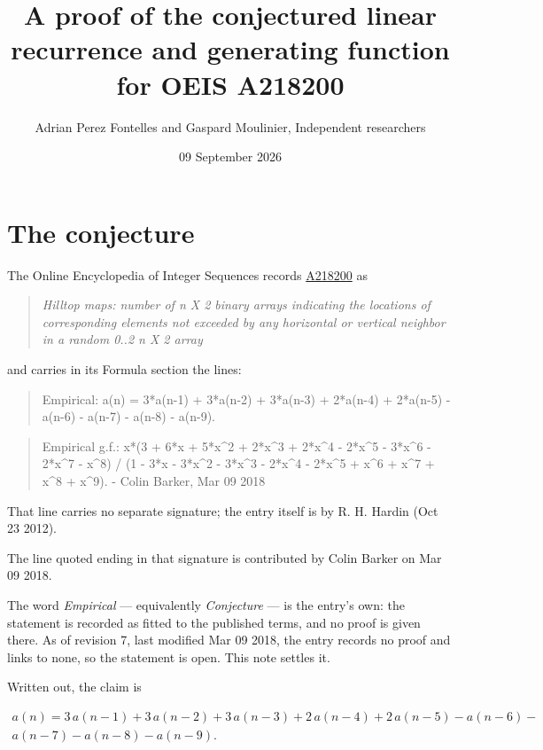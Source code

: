 \documentclass[11pt]{article}
\title{A proof of the conjectured linear recurrence and generating function for OEIS A218200}
\author{Adrian Perez Fontelles and Gaspard Moulinier, Independent researchers}
\date{09 September 2026}
\theoremstyle{definition}
\begin{document}
\maketitle
\section{The conjecture}

The Online Encyclopedia of Integer Sequences records \href{https://oeis.org/A218200}{A218200} as

\begin{quote}\itshape Hilltop maps: number of n X 2 binary arrays indicating the locations of corresponding elements not exceeded by any horizontal or vertical neighbor in a random 0..2 n X 2 array\end{quote}

and carries in its Formula section the lines:

\begin{quote}\ttfamily Empirical: a(n) = 3*a(n-1) + 3*a(n-2) + 3*a(n-3) + 2*a(n-4) + 2*a(n-5) - a(n-6) - a(n-7) - a(n-8) - a(n-9).\end{quote}

\begin{quote}\ttfamily Empirical g.f.: x*(3 + 6*x + 5*x\textasciicircum{}2 + 2*x\textasciicircum{}3 + 2*x\textasciicircum{}4 - 2*x\textasciicircum{}5 - 3*x\textasciicircum{}6 - 2*x\textasciicircum{}7 - x\textasciicircum{}8) / (1 - 3*x - 3*x\textasciicircum{}2 - 3*x\textasciicircum{}3 - 2*x\textasciicircum{}4 - 2*x\textasciicircum{}5 + x\textasciicircum{}6 + x\textasciicircum{}7 + x\textasciicircum{}8 + x\textasciicircum{}9). - Colin Barker, Mar 09 2018\end{quote}

That line carries no separate signature; the entry itself is by R. H. Hardin (Oct 23 2012).

The line quoted ending in that signature is contributed by Colin Barker on Mar 09 2018.

The word {\itshape Empirical} --- equivalently {\itshape Conjecture} --- is the entry's own: the statement is recorded as fitted to the published terms, and no proof is given there. As of revision 7, last modified Mar 09 2018, the entry records no proof and links to none, so the statement is open. This note settles it.

Written out, the claim is

\begin{multline*} a(n) = 3\,a(n-1) + 3\,a(n-2) + 3\,a(n-3) + 2\,a(n-4) + 2\,a(n-5) - a(n-6) - \\ a(n-7) - a(n-8) - a(n-9). \end{multline*}
\end{document}
